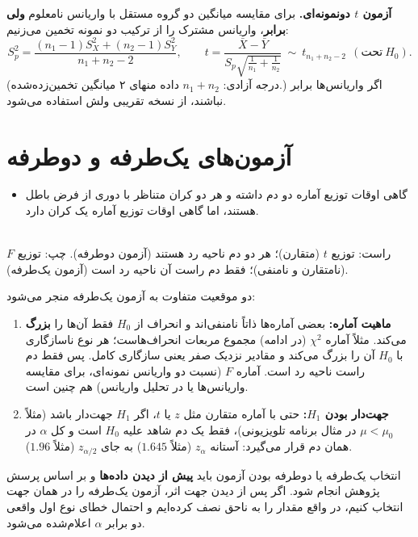 \begin{note}
\notetitle \textbf{آزمون $t$ دونمونه‌ای.} برای مقایسه میانگین دو گروه مستقل با واریانس نامعلوم \textbf{ولی برابر}، واریانس مشترک را از ترکیب دو نمونه تخمین می‌زنیم:
\[
S_p^2=\frac{(n_1-1)S_X^2+(n_2-1)S_Y^2}{n_1+n_2-2},\qquad
t=\frac{\bar X-\bar Y}{S_p\sqrt{\frac1{n_1}+\frac1{n_2}}}\ \sim\ t_{n_1+n_2-2}\ \ (\text{تحت}\ H_0).
\]
(درجه آزادی: $n_1+n_2$ داده منهای ۲ میانگین تخمین‌زده‌شده.) اگر واریانس‌ها برابر نباشند، از نسخه تقریبی ولش  استفاده می‌شود.
\end{note}

\section{آزمون‌های یک‌طرفه و دوطرفه }
\begin{itemize}
\item گاهی اوقات توزیع آماره دو دم  داشته و هر دو کران متناظر با دوری  از فرض باطل هستند، اما گاهی اوقات توزیع آماره یک کران دارد.
\end{itemize}

\begin{center}
\begin{tikzpicture}
\end{tikzpicture}\\
{\small راست: توزیع $t$ (متقارن)؛ هر دو دم ناحیه رد هستند (آزمون دوطرفه). چپ: توزیع $F$ (نامتقارن و نامنفی)؛ فقط دم راست آن ناحیه رد است (آزمون یک‌طرفه).}
\end{center}

دو موقعیت متفاوت به آزمون یک‌طرفه منجر می‌شود:
\begin{enumerate}
\item \textbf{ماهیت آماره:} بعضی آماره‌ها ذاتاً نامنفی‌اند و انحراف از $H_0$ فقط آن‌ها را \textbf{بزرگ} می‌کند. مثلاً آماره $\chi^2$ (در ادامه) مجموع مربعات انحراف‌هاست؛ هر نوع ناسازگاری با $H_0$ آن را بزرگ می‌کند و مقادیر نزدیک صفر یعنی سازگاری کامل. پس فقط دم راست ناحیه رد است. آماره $F$ (نسبت دو واریانس نمونه‌ای، برای مقایسه واریانس‌ها یا در تحلیل واریانس) هم چنین است.
\item \textbf{جهت‌دار بودن $H_1$:} حتی با آماره متقارن مثل $z$ یا $t$، اگر $H_1$ جهت‌دار باشد (مثلاً $\mu<\mu_0$ در مثال برنامه تلویزیونی)، فقط یک دم شاهد علیه $H_0$ است و کل $\alpha$ در همان دم قرار می‌گیرد: آستانه $z_\alpha$ (مثلاً $1.645$) به جای $z_{\alpha/2}$ (مثلاً $1.96$).
\end{enumerate}

\begin{warning}
\warntitle انتخاب یک‌طرفه یا دوطرفه بودن آزمون باید \textbf{پیش از دیدن داده‌ها} و بر اساس پرسش پژوهش انجام شود. اگر پس از دیدن جهت اثر، آزمون یک‌طرفه را در همان جهت انتخاب کنیم، در واقع مقدار  را به ناحق نصف کرده‌ایم و احتمال خطای نوع اول واقعی دو برابر $\alpha$ اعلام‌شده می‌شود.
\end{warning}

